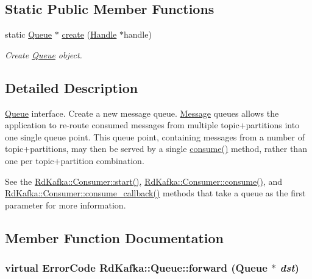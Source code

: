 \subsection*{Static Public Member Functions}
\begin{DoxyCompactItemize}
\item 
\hypertarget{classRdKafka_1_1Queue_a00580bec19f1f7c554ca42ba06c6e2f5}{
static \hyperlink{classRdKafka_1_1Queue}{Queue} $\ast$ \hyperlink{classRdKafka_1_1Queue_a00580bec19f1f7c554ca42ba06c6e2f5}{create} (\hyperlink{classRdKafka_1_1Handle}{Handle} $\ast$handle)}
\label{classRdKafka_1_1Queue_a00580bec19f1f7c554ca42ba06c6e2f5}

\begin{DoxyCompactList}\small\item\em Create \hyperlink{classRdKafka_1_1Queue}{Queue} object. \item\end{DoxyCompactList}\end{DoxyCompactItemize}


\subsection{Detailed Description}
\hyperlink{classRdKafka_1_1Queue}{Queue} interface. Create a new message queue. \hyperlink{classRdKafka_1_1Message}{Message} queues allows the application to re-\/route consumed messages from multiple topic+partitions into one single queue point. This queue point, containing messages from a number of topic+partitions, may then be served by a single \hyperlink{classRdKafka_1_1Queue_aa8a0ff1e3df108e8bb6c9ef611f5eef4}{consume()} method, rather than one per topic+partition combination.

See the \hyperlink{classRdKafka_1_1Consumer_ad2044e3433f626baff667e1a429d6f33}{RdKafka::Consumer::start()}, \hyperlink{classRdKafka_1_1Consumer_a0afd32e342283fc10fa6f32cc25950b7}{RdKafka::Consumer::consume()}, and \hyperlink{classRdKafka_1_1Consumer_a15a3e64a1ed777804df8b4ea02a40887}{RdKafka::Consumer::consume\_\-callback()} methods that take a queue as the first parameter for more information. 

\subsection{Member Function Documentation}
\hypertarget{classRdKafka_1_1Queue_a49827afcb8804719ffc23d120915b371}{
\subsubsection[{forward}]{\setlength{\rightskip}{0pt plus 5cm}virtual ErrorCode RdKafka::Queue::forward ({\bf Queue} $\ast$ {\em dst})}}
\label{classRdKafka_1_1Queue_a49827afcb8804719ffc23d120915b371}


